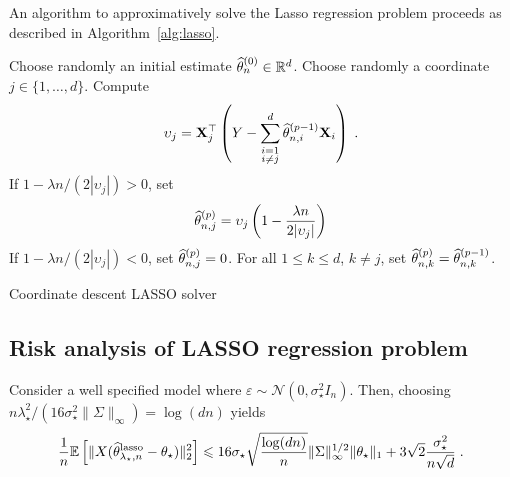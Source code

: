 An algorithm to approximatively solve the Lasso regression problem proceeds as described in Algorithm~\ref{alg:lasso}.
\begin{algorithm}
\centering
\begin{algorithmic}
\State Choose randomly an initial estimate $\widehat {\theta}_n^{(0)}\in\mathbb{R}^d$.
\State Choose randomly a coordinate $j\in\{1,\ldots, d\}$.
\State Compute
\[
\upsilon_{j}={\bf X}^\top_{j}\left(Y-\sum_{\substack{i=1\\ i\neq j}}^d\widehat{\theta}^{(p-1)}_{n,i}{\bf X}_{i}\right)\;.
\]
\State If $1 - \lambda n/(2 |\upsilon_j|)>0$, set 
\[
\widehat{\theta}^{(p)}_{n,j}= \upsilon_j\left(1 - \frac{\lambda n }{2 |\upsilon_j|}\right)
\]
\State If $1 - \lambda n/(2 |\upsilon_j|)<0$, set $\widehat{\theta}^{(p)}_{n,j}=0$.
\State For all $1\leqslant k \leqslant d$, $k\neq j$, set $\widehat{\theta}^{(p)}_{n,k} = \widehat{\theta}^{(p-1)}_{n,k}$.
\EndFor
\end{algorithmic}
\caption{Coordinate descent LASSO solver}
\label{alg:lasso}
\end{algorithm}

\subsection{Risk analysis of LASSO regression problem}
\begin{proposition}
Consider a well specified model where $\varepsilon \sim \mathcal{N}(0,\sigma_\star^2 I_n)$. Then, choosing $n\lambda_\star^2/(16\sigma_\star^2  \|\Sigma\|_\infty) = \log(dn)$ yields
$$
\frac{1}{n}\mathbb{E}\left[\|X(\widehat{\theta}^{\mathrm{lasso}}_{\lambda_\star,n}-\theta_\star)\|_2^2\right] \leqslant  16\sigma_\star\sqrt{\frac{\log(dn)}{n}}\|\Sigma\|_\infty^{1/2}\|\theta_\star\|_1  + 3\sqrt{2}\frac{\sigma_\star^2}{n\sqrt{d}} \;.
$$
\end{proposition}

